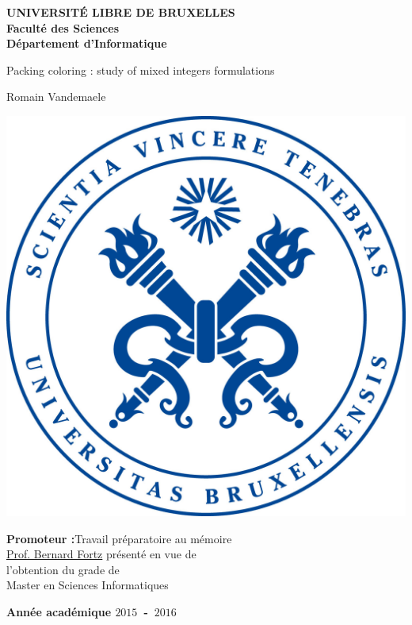 \documentclass[12pt,a4paper,oneside]{book}
\numberwithin{equation}{chapter}
\begin{document}
\frontmatter
\begin{titlepage}
\begin{center}
	\textbf{UNIVERSIT\'E LIBRE DE BRUXELLES}\\
	\textbf{Facult\'e des Sciences}\\
	\textbf{D\'epartement d'Informatique}
	\vfill{}\vfill{}

	{\Huge  Packing coloring : study of mixed integers formulations}

	{\Huge \par}
	\begin{center}{\LARGE Romain Vandemaele}\end{center}{\Huge \par}
	\vfill{}
	\includegraphics[keepaspectratio=true,scale=0.2]{figures/ulb.jpg}
	\vfill{}
	\begin{flushright}{\large \textbf{Promoteur :}}\hfill{}{\large Travail pr\'eparatoire au m\'emoire}\\ {\large \href{http://homepages.ulb.ac.be/~bfortz/}{Prof. Bernard Fortz}}\hfill{}
    {pr\'esent\'e en vue de}\\
	{\large l'obtention du grade de}\\
	\hfill{}{\large Master en Sciences Informatiques}\end{flushright}{\large\par}
	\vfill{}\vfill{}\enlargethispage{3cm}
	\textbf{Ann\'ee acad\'emique $2015$~-~$2016$}
\end{center}
\end{titlepage}
\newpage
\thispagestyle{empty}
\null
\end{document}
